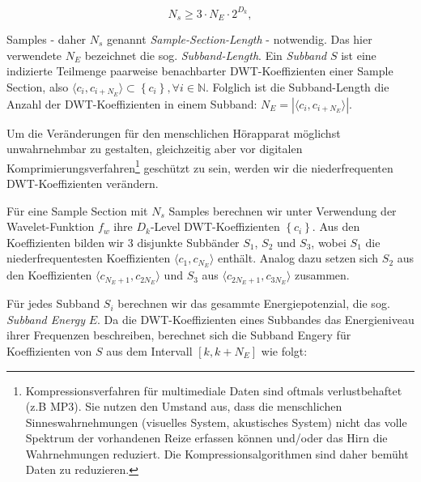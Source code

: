 	 \begin{equation}
		 {N}_{s} \geq 3 \cdot {N}_{E} \cdot 2 ^ {{D}_{k}}, 			\label{equ:samplseclength}
	 \end{equation}
	 
Samples - daher ${N}_{s}$ genannt \textit{Sample-Section-Length} - notwendig. Das hier verwendete ${N}_{E}$ bezeichnet die sog. \textit{Subband-Length}. Ein \textit{Subband} $S$ ist eine indizierte Teilmenge paarweise benachbarter DWT-Koeffizienten einer Sample Section, also $\langle{c}_{i},{c}_{i+{N}_{E}}\rangle \subset \left\{{c}_{i}\right\}, \forall i \in \mathbb{N}$. Folglich ist die Subband-Length die Anzahl der DWT-Koeffizienten in einem Subband: ${N}_{E} = |\langle{c}_{i},{c}_{i+{N}_{E}}\rangle|$.

\bigskip

Um die Veränderungen für den menschlichen Hörapparat möglichst unwahrnehmbar zu gestalten, gleichzeitig aber vor digitalen Komprimierungsverfahren\footnote{Kompressionsverfahren für multimediale Daten sind oftmals verlustbehaftet (z.B MP3). Sie nutzen den Umstand aus, dass die menschlichen Sinneswahrnehmungen (visuelles System, akustisches System) nicht das volle Spektrum der vorhandenen Reize erfassen können und/oder das Hirn die Wahrnehmungen reduziert. Die Kompressionsalgorithmen sind daher bemüht \grqq{} Daten zu reduzieren.} geschützt zu sein, werden wir die niederfrequenten DWT-Koeffizienten verändern. 

Für eine Sample Section mit ${N}_{s}$ Samples berechnen wir unter Verwendung der Wavelet-Funktion ${f}_{w}$ ihre ${D}_{k}$-Level DWT-Koeffizienten $\left\{{c}_{i}\right\}$. Aus den Koeffizienten bilden wir 3 disjunkte Subbänder ${S}_{1}$, ${S}_{2}$ und ${S}_{3}$, wobei ${S}_{1}$ die niederfrequentesten Koeffizienten $\langle{c}_{1},{c}_{{N}_{E}}\rangle$ enthält. Analog dazu setzen sich ${S}_{2}$ aus den Koeffizienten $\langle{c}_{{N}_{E}+1},{c}_{2{N}_{E}}\rangle$ und ${S}_{3}$ aus $\langle{c}_{2{N}_{E}+1},{c}_{3{N}_{E}}\rangle$ zusammen. 

Für jedes Subband ${S}_{i}$ berechnen wir das gesammte Energiepotenzial, die sog. \textit{Subband Energy} $E$. Da die DWT-Koeffizienten eines Subbandes das Energieniveau ihrer Frequenzen beschreiben, berechnet sich die Subband Engery für Koeffizienten von $S$ aus dem Intervall $[k, k+{N}_{E}]$ wie folgt:

